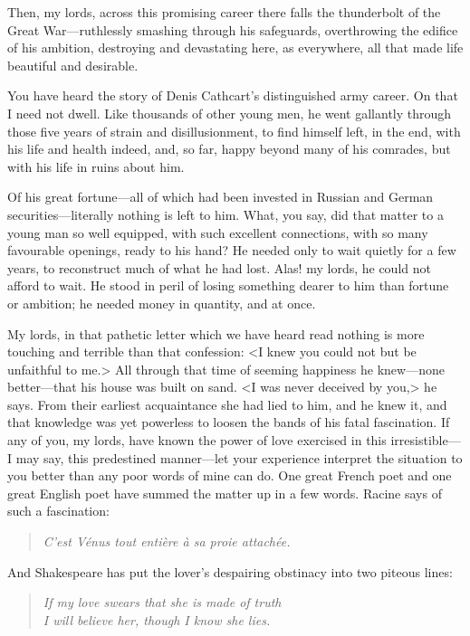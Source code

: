 \begin{dialogue}
Then, my lords, across this promising career there falls the thunderbolt of the Great War—ruthlessly smashing through his safeguards, overthrowing the edifice of his ambition, destroying and devastating here, as everywhere, all that made life beautiful and desirable.

You have heard the story of Denis Cathcart's distinguished army career. On that I need not dwell. Like thousands of other young men, he went gallantly through those five years of strain and disillusionment, to find himself left, in the end, with his life and health indeed, and, so far, happy beyond many of his comrades, but with his life in ruins about him.

Of his great fortune—all of which had been invested in Russian and German securities—literally nothing is left to him. What, you say, did that matter to a young man so well equipped, with such excellent connections, with so many favourable openings, ready to his hand? He needed only to wait quietly for a few years, to reconstruct much of what he had lost. Alas! my lords, he could not afford to wait. He stood in peril of losing something dearer to him than fortune or ambition; he needed money in quantity, and at once.

My lords, in that pathetic letter which we have heard read nothing is more touching and terrible than that confession: <I knew you could not but be unfaithful to me.> All through that time of seeming happiness he knew—none better—that his house was built on sand. <I was never deceived by you,> he says. From their earliest acquaintance she had lied to him, and he knew it, and that knowledge was yet powerless to loosen the bands of his fatal fascination. If any of you, my lords, have known the power of love exercised in this irresistible—I may say, this predestined manner—let your experience interpret the situation to you better than any poor words of mine can do. One great French poet and one great English poet have summed the matter up in a few words. Racine says of such a fascination:

\begin{quote}\itshape C'est Vénus tout entière à sa proie attachée.\end{quote}

And Shakespeare has put the lover's despairing obstinacy into two piteous lines:

\begin{quote}\itshape
If my love swears that she is made of truth\\
I will believe her, though I know she lies.\\
\end{quote}


\end{dialogue}
